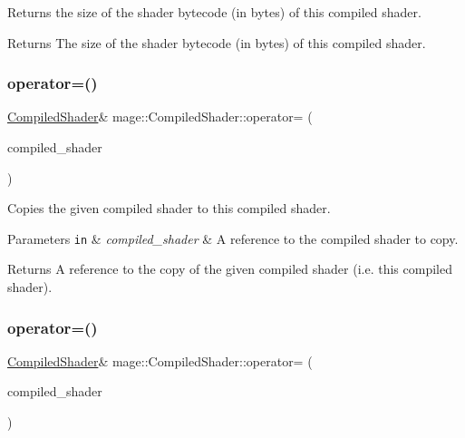 Returns the size of the shader bytecode (in bytes) of this compiled shader.

\begin{DoxyReturn}{Returns}
The size of the shader bytecode (in bytes) of this compiled shader. 
\end{DoxyReturn}
\hypertarget{structmage_1_1_compiled_shader_a0744c55c5847abe75b89b66ded5cda8b}{}\label{structmage_1_1_compiled_shader_a0744c55c5847abe75b89b66ded5cda8b} 
\subsubsection{\texorpdfstring{operator=()}{operator=()}\hspace{0.1cm}{\footnotesize\ttfamily [1/2]}}
{\footnotesize\ttfamily \hyperlink{structmage_1_1_compiled_shader}{Compiled\+Shader}\& mage\+::\+Compiled\+Shader\+::operator= (\begin{DoxyParamCaption}\item[{const \hyperlink{structmage_1_1_compiled_shader}{Compiled\+Shader} \&}]{compiled\+\_\+shader }\end{DoxyParamCaption})\hspace{0.3cm}{\ttfamily [delete]}}

Copies the given compiled shader to this compiled shader.


\begin{DoxyParams}[1]{Parameters}
\mbox{\tt in}  & {\em compiled\+\_\+shader} & A reference to the compiled shader to copy. \\
\hline
\end{DoxyParams}
\begin{DoxyReturn}{Returns}
A reference to the copy of the given compiled shader (i.\+e. this compiled shader). 
\end{DoxyReturn}
\hypertarget{structmage_1_1_compiled_shader_abaacfe0cbd94d14dde20d5ce2209c374}{}\label{structmage_1_1_compiled_shader_abaacfe0cbd94d14dde20d5ce2209c374} 
\subsubsection{\texorpdfstring{operator=()}{operator=()}\hspace{0.1cm}{\footnotesize\ttfamily [2/2]}}
{\footnotesize\ttfamily \hyperlink{structmage_1_1_compiled_shader}{Compiled\+Shader}\& mage\+::\+Compiled\+Shader\+::operator= (\begin{DoxyParamCaption}\item[{\hyperlink{structmage_1_1_compiled_shader}{Compiled\+Shader} \&\&}]{compiled\+\_\+shader }\end{DoxyParamCaption})\hspace{0.3cm}{\ttfamily [delete]}}

